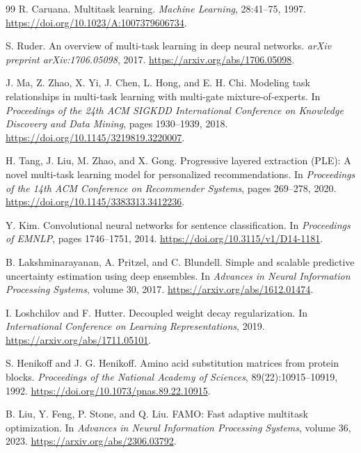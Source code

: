\begin{thebibliography}{99}
R. Caruana.
\newblock Multitask learning.
\newblock \emph{Machine Learning}, 28:41--75, 1997.
\newblock \url{https://doi.org/10.1023/A:1007379606734}.

S. Ruder.
\newblock An overview of multi-task learning in deep neural networks.
\newblock \emph{arXiv preprint arXiv:1706.05098}, 2017.
\newblock \url{https://arxiv.org/abs/1706.05098}.

J. Ma, Z. Zhao, X. Yi, J. Chen, L. Hong, and E. H. Chi.
\newblock Modeling task relationships in multi-task learning with multi-gate mixture-of-experts.
\newblock In \emph{Proceedings of the 24th ACM SIGKDD International Conference on Knowledge Discovery and Data Mining}, pages 1930--1939, 2018.
\newblock \url{https://doi.org/10.1145/3219819.3220007}.

H. Tang, J. Liu, M. Zhao, and X. Gong.
\newblock Progressive layered extraction (PLE): A novel multi-task learning model for personalized recommendations.
\newblock In \emph{Proceedings of the 14th ACM Conference on Recommender Systems}, pages 269--278, 2020.
\newblock \url{https://doi.org/10.1145/3383313.3412236}.

Y. Kim.
\newblock Convolutional neural networks for sentence classification.
\newblock In \emph{Proceedings of EMNLP}, pages 1746--1751, 2014.
\newblock \url{https://doi.org/10.3115/v1/D14-1181}.

B. Lakshminarayanan, A. Pritzel, and C. Blundell.
\newblock Simple and scalable predictive uncertainty estimation using deep ensembles.
\newblock In \emph{Advances in Neural Information Processing Systems}, volume 30, 2017.
\newblock \url{https://arxiv.org/abs/1612.01474}.

I. Loshchilov and F. Hutter.
\newblock Decoupled weight decay regularization.
\newblock In \emph{International Conference on Learning Representations}, 2019.
\newblock \url{https://arxiv.org/abs/1711.05101}.

S. Henikoff and J. G. Henikoff.
\newblock Amino acid substitution matrices from protein blocks.
\newblock \emph{Proceedings of the National Academy of Sciences}, 89(22):10915--10919, 1992.
\newblock \url{https://doi.org/10.1073/pnas.89.22.10915}.

B. Liu, Y. Feng, P. Stone, and Q. Liu.
\newblock FAMO: Fast adaptive multitask optimization.
\newblock In \emph{Advances in Neural Information Processing Systems}, volume 36, 2023.
\newblock \url{https://arxiv.org/abs/2306.03792}.


\end{thebibliography}
